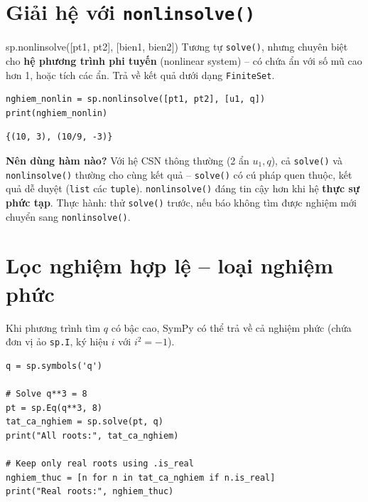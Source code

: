\documentclass[12pt,a4paper]{report}
\begin{document}
\section{Giải hệ với \texttt{nonlinsolve()}}

\begin{syntaxbox}{sp.nonlinsolve([pt1, pt2], [bien1, bien2])}
Tương tự \texttt{solve()}, nhưng chuyên biệt cho \textbf{hệ phương
trình phi tuyến} (nonlinear system) -- có chứa ẩn với số mũ cao hơn 1,
hoặc tích các ẩn. Trả về kết quả dưới dạng \texttt{FiniteSet}.
\end{syntaxbox}

\begin{lstlisting}[caption={Giải hệ bằng nonlinsolve}]
nghiem_nonlin = sp.nonlinsolve([pt1, pt2], [u1, q])
print(nghiem_nonlin)
\end{lstlisting}

\begin{lstlisting}[style=outstyle,numbers=none]
{(10, 3), (10/9, -3)}
\end{lstlisting}

\begin{tipbox}
\textbf{Nên dùng hàm nào?} Với hệ CSN thông thường (2 ẩn $u_1, q$), cả
\texttt{solve()} và \texttt{nonlinsolve()} thường cho cùng kết quả --
\texttt{solve()} có cú pháp quen thuộc, kết quả dễ duyệt (\texttt{list}
các \texttt{tuple}). \texttt{nonlinsolve()} đáng tin cậy hơn khi hệ
\textbf{thực sự phức tạp}. Thực hành: thử \texttt{solve()} trước, nếu
báo không tìm được nghiệm mới chuyển sang \texttt{nonlinsolve()}.
\end{tipbox}

\section{Lọc nghiệm hợp lệ -- loại nghiệm phức}

Khi phương trình tìm $q$ có bậc cao, SymPy có thể trả về cả nghiệm phức
(chứa đơn vị ảo \texttt{sp.I}, ký hiệu $i$ với $i^2 = -1$).

\begin{lstlisting}[caption={Giải phương trình bậc ba và lọc nghiệm thực}]
q = sp.symbols('q')

# Solve q**3 = 8
pt = sp.Eq(q**3, 8)
tat_ca_nghiem = sp.solve(pt, q)
print("All roots:", tat_ca_nghiem)

# Keep only real roots using .is_real
nghiem_thuc = [n for n in tat_ca_nghiem if n.is_real]
print("Real roots:", nghiem_thuc)
\end{lstlisting}
\end{document}
